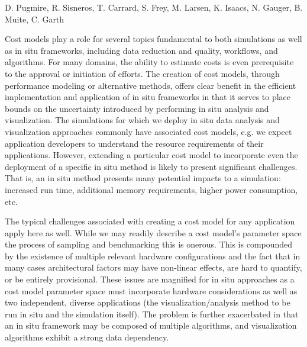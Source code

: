 \license

 D. Pugmire, R. Sisneros, T. Carrard, S. Frey, M. Larsen, K. Isaacs, N. Gauger, B. Muite, C. Garth

\begin{refsection}
Cost models play a role for several topics fundamental to both simulations as well as in situ frameworks, including data reduction and quality, workflows, and algorithms.  
For many domains, the ability to estimate costs is even prerequisite to the approval or initiation of efforts. 
The creation of cost models, through performance modeling or alternative methods, offers clear benefit in the efficient implementation and application of in situ frameworks in that it serves to place bounds on the uncertainty introduced by performing in situ analysis and visualization. 
The simulations for which we deploy in situ data analysis and visualization approaches commonly have associated cost models, e.g. we expect application developers to understand the resource requirements of their applications.  
However, extending a particular cost model to incorporate even the deployment of a specific in situ method is likely to present significant challenges.  That is, an in situ method presents many potential impacts to a simulation: increased run time, additional memory requirements, higher power consumption, etc.

 The typical challenges associated with creating a cost model for any application apply here as well. 
While we may readily describe a cost model’s parameter space the process of sampling and benchmarking this is onerous.  
This is compounded by the existence of multiple relevant hardware configurations and the fact that in many cases architectural factors may have non-linear effects, are hard to quantify, or be entirely provisional.  
These issues are magnified for in situ approaches as a cost model parameter space must incorporate hardware considerations as well as two independent, diverse applications (the visualization/analysis method to be run in situ and the simulation itself).  
The problem is further exacerbated in that an in situ framework may be composed of multiple algorithms, and visualization algorithms exhibit a strong data dependency.


\end{refsection}
